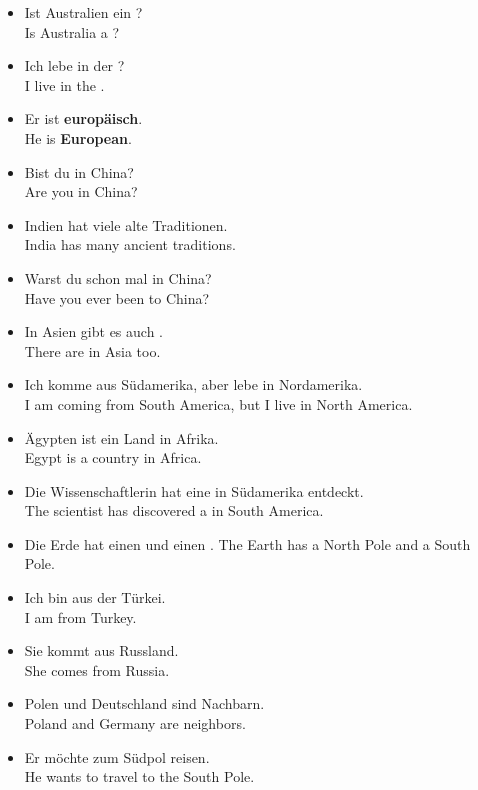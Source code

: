 \begin{itemize}
  \item  Ist Australien ein ? \\
  Is Australia a ?
  \item  Ich lebe in der ? \\
  I live in the .
  \item  Er ist \textbf{europ{\"a}isch}. \\
  He is \textbf{European}.
  \item  Bist du in China? \\
  Are you in China?
  \item  Indien hat viele alte Traditionen. \\
  India has many ancient traditions.
  \item  Warst du schon mal in China? \\
  Have you ever been to China?
  \item  In Asien gibt es auch . \\
  There are  in Asia too.
  \item  Ich komme aus S{\"u}damerika, aber lebe in Nordamerika. \\
  I am coming from South America, but I live in North America.
  \item  {\"A}gypten ist ein Land in Afrika. \\
  Egypt is a country in Africa.
  \item  Die Wissenschaftlerin hat eine  in S{\"u}damerika entdeckt. \\
  The scientist has discovered a  in South America.
  \item  Die Erde hat einen  und einen .
  The Earth has a North Pole and a South Pole.
  \item  Ich bin aus der T{\"u}rkei. \\
  I am from Turkey.
  \item  Sie kommt aus Russland. \\
  She comes from Russia.
  \item  Polen und Deutschland sind Nachbarn. \\
  Poland and Germany are neighbors.
  \item  Er m{\"o}chte zum S{\"u}dpol reisen. \\
  He wants to travel to the South Pole.
\end{itemize}